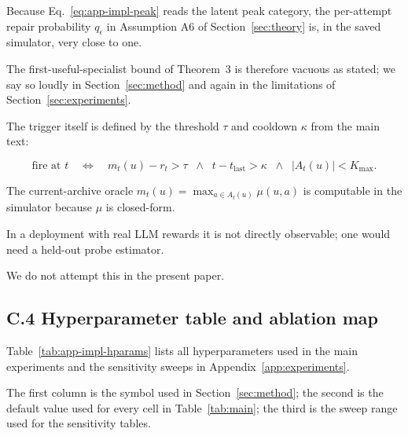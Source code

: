 \documentclass{article} %
\begin{document}
Because Eq.~\eqref{eq:app-impl-peak} reads the latent peak category, the per-attempt repair probability $q_\epsilon$ in Assumption A6 of Section~\ref{sec:theory} is, in the saved simulator, very close to one.

The first-useful-specialist bound of Theorem~3 is therefore vacuous as stated; we say so loudly in Section~\ref{sec:method} and again in the limitations of Section~\ref{sec:experiments}.

The trigger itself is defined by the threshold $\tau$ and cooldown $\kappa$ from the main text:

\begin{equation}
\label{eq:app-impl-trigger}
\text{fire at } t \quad\Longleftrightarrow\quad m_t(u) - r_t > \tau \;\;\wedge\;\; t - t_{\text{last}} > \kappa \;\;\wedge\;\; |A_t(u)| < K_{\max}.
\end{equation}

The current-archive oracle $m_t(u) = \max_{a \in A_t(u)} \mu(u, a)$ is computable in the simulator because $\mu$ is closed-form.

In a deployment with real LLM rewards it is not directly observable; one would need a held-out probe estimator.

We do not attempt this in the present paper.

\subsection{C.4 Hyperparameter table and ablation map}

\label{app:impl-hparams}

Table~\ref{tab:app-impl-hparams} lists all hyperparameters used in the main experiments and the sensitivity sweeps in Appendix~\ref{app:experiments}.

The first column is the symbol used in Section~\ref{sec:method}; the second is the default value used for every cell in Table~\ref{tab:main}; the third is the sweep range used for the sensitivity tables.
\end{document}
